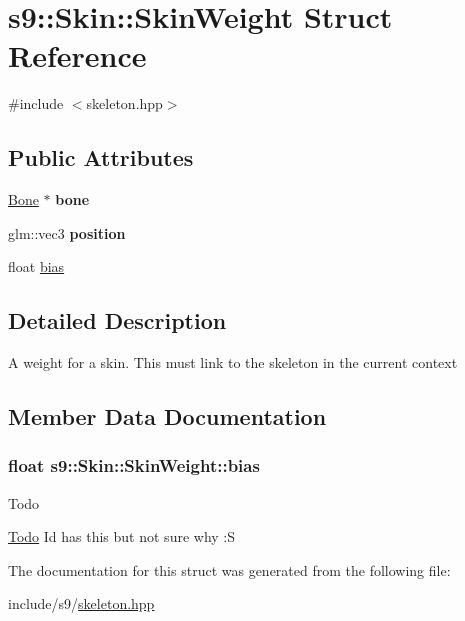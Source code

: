 \hypertarget{structs9_1_1Skin_1_1SkinWeight}{\section{s9\-:\-:Skin\-:\-:Skin\-Weight Struct Reference}
\label{structs9_1_1Skin_1_1SkinWeight}
}


{\ttfamily \#include $<$skeleton.\-hpp$>$}

\subsection*{Public Attributes}
\begin{DoxyCompactItemize}
\item 
\hypertarget{structs9_1_1Skin_1_1SkinWeight_a91bffc13f035a9d7de21910b76a8f14b}{\hyperlink{structs9_1_1Bone}{Bone} $\ast$ {\bfseries bone}}\label{structs9_1_1Skin_1_1SkinWeight_a91bffc13f035a9d7de21910b76a8f14b}

\item 
\hypertarget{structs9_1_1Skin_1_1SkinWeight_a83136a12df6423634490bc04946d383b}{glm\-::vec3 {\bfseries position}}\label{structs9_1_1Skin_1_1SkinWeight_a83136a12df6423634490bc04946d383b}

\item 
float \hyperlink{structs9_1_1Skin_1_1SkinWeight_a8f9650be7ec3144f2fef974d18ef2555}{bias}
\end{DoxyCompactItemize}


\subsection{Detailed Description}
A weight for a skin. This must link to the skeleton in the current context 

\subsection{Member Data Documentation}
\hypertarget{structs9_1_1Skin_1_1SkinWeight_a8f9650be7ec3144f2fef974d18ef2555}{
\subsubsection[{bias}]{\setlength{\rightskip}{0pt plus 5cm}float s9\-::\-Skin\-::\-Skin\-Weight\-::bias}}\label{structs9_1_1Skin_1_1SkinWeight_a8f9650be7ec3144f2fef974d18ef2555}
\begin{DoxyRefDesc}{Todo}
\item[\hyperlink{todo__todo000042}{Todo}]Id has this but not sure why \-:S \end{DoxyRefDesc}


The documentation for this struct was generated from the following file\-:\begin{DoxyCompactItemize}
\item 
include/s9/\hyperlink{skeleton_8hpp}{skeleton.\-hpp}\end{DoxyCompactItemize}
